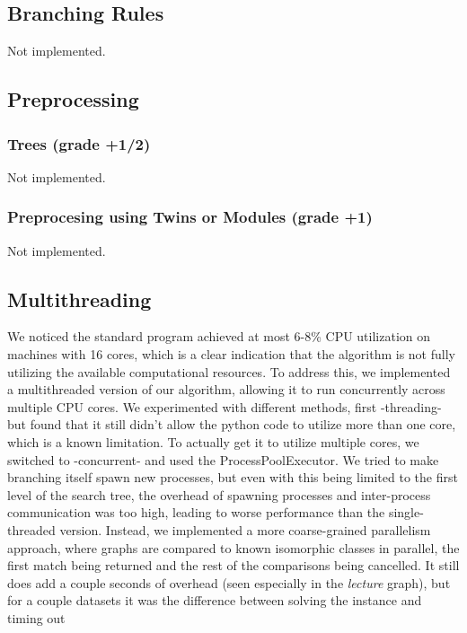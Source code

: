 \documentclass[twoside]{article}
\begin{document}
\subsection{Branching Rules}
Not implemented.
\subsection{Preprocessing}

\subsubsection{Trees (grade +1/2)}
Not implemented.


\subsubsection{Preprocesing using Twins or Modules (grade +1)}
Not implemented.

\subsection{Multithreading}
We noticed the standard program achieved at most 6-8\% CPU utilization on machines with 16 cores, which is a clear indication that the algorithm is not fully utilizing the available computational resources. To address this, we implemented a multithreaded version of our algorithm, allowing it to run concurrently across multiple CPU cores.
We experimented with different methods, first -threading- but found that it still didn't allow the python code to utilize more than one core, which is a known limitation.
To actually get it to utilize multiple cores, we switched to -concurrent- and used the ProcessPoolExecutor.
We tried to make branching itself spawn new processes, but even with this being limited to the first level of the search tree, the overhead of spawning processes and inter-process communication was too high, leading to worse performance than the single-threaded version.
Instead, we implemented a more coarse-grained parallelism approach, where graphs are compared to known isomorphic classes in parallel, the first match being returned and the rest of the comparisons being cancelled.
It still does add a couple seconds of overhead (seen especially in the \emph{lecture} graph), but for a couple datasets it was the difference between solving the instance and timing out
\end{document}
